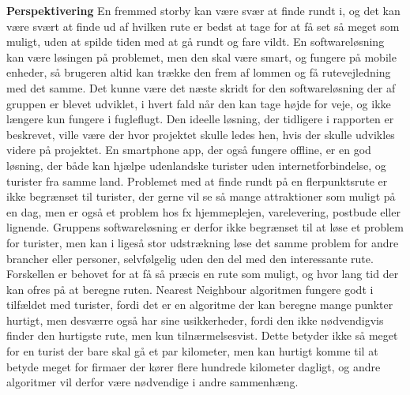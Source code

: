 \textbf{Perspektivering} \newline
En fremmed storby kan være svær at finde rundt i, og det kan være svært at finde ud af hvilken rute er bedst at tage for at få set så meget som muligt, uden at spilde tiden med at gå rundt og fare vildt. En softwareløsning kan være løsingen på problemet, men den skal være smart, og fungere på mobile enheder, så brugeren altid kan trække den frem af lommen og få rutevejledning med det samme. Det kunne være det næste skridt for den softwareløsning der af gruppen er blevet udviklet, i hvert fald når den kan tage højde for veje, og ikke længere kun fungere i fugleflugt. Den ideelle løsning, der tidligere i rapporten er beskrevet, ville være der hvor projektet skulle ledes hen, hvis der skulle udvikles videre på projektet. En smartphone app, der også fungere offline, er en god løsning, der både kan hjælpe udenlandske turister uden internetforbindelse, og turister fra samme land. \newline
Problemet med at finde rundt på en flerpunktsrute er ikke begrænset til turister, der gerne vil se så mange attraktioner som muligt på en dag, men er også et problem hos fx hjemmeplejen, varelevering, postbude eller lignende. Gruppens softwareløsning er derfor ikke begrænset til at løse et problem for turister, men kan i ligeså stor udstrækning løse det samme problem for andre brancher eller personer, selvfølgelig uden den del med den interessante rute. Forskellen er behovet for at få så præcis en rute som muligt, og hvor lang tid der kan ofres på at beregne ruten. Nearest Neighbour algoritmen fungere godt i tilfældet med turister, fordi det er en algoritme der kan beregne mange punkter hurtigt, men desværre også har sine usikkerheder, fordi den ikke nødvendigvis finder den hurtigste rute, men kun tilnærmelsesvist. Dette betyder ikke så meget for en turist der bare skal gå et par kilometer, men kan hurtigt komme til at betyde meget for firmaer der kører flere hundrede kilometer dagligt, og andre algoritmer vil derfor være nødvendige i andre sammenhæng. 
